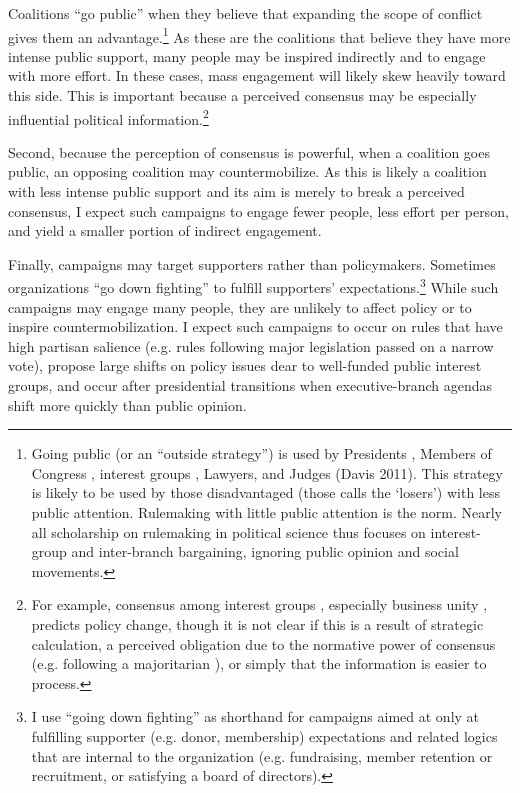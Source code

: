 Coalitions ``go public'' when they believe that expanding the scope of conflict gives them an advantage.\footnote{
Going public (or an ``outside strategy'') is used by Presidents \citep{Kernell2007}, Members of Congress \citep{Malecha2012}, interest groups \citep{Walker1991, Dur2013}, Lawyers, and Judges (Davis 2011). 
This strategy is likely to be used by those disadvantaged (those \citet{Schattschneider1975} calls the `losers') with less public attention.
Rulemaking with little public attention is the norm. Nearly all scholarship on rulemaking in political science thus focuses on interest-group and inter-branch bargaining, ignoring public opinion and social movements. 
}
As these are the coalitions that believe they have more intense public support, many people may be inspired indirectly and to engage with more effort. In these cases, mass engagement will likely skew heavily toward this side. This is important because a perceived consensus may be especially influential political information.\footnote{
For example, consensus among interest groups \citep{Golden1998, Yackee2006JPART}, especially business unity \citep{Yackee2006JOP, Haeder2015}, predicts policy change, though it is not clear if this is a result of strategic calculation, a perceived obligation due to the normative power of consensus (e.g. following a majoritarian \citep{Mendelson2011}), or simply that the information is easier to process.
}

Second, because the perception of consensus is powerful, when a coalition goes public, an opposing coalition may countermobilize. As this is likely a coalition with less intense public support and its aim is merely to break a perceived consensus, I expect such campaigns to engage fewer people, less effort per person, and yield a smaller portion of indirect engagement. 

Finally, campaigns may target supporters rather than policymakers. Sometimes organizations ``go down fighting'' to fulfill supporters' expectations.\footnote{
I use ``going down fighting'' as shorthand for campaigns aimed at only at fulfilling supporter (e.g. donor, membership) expectations and related logics that are internal to the organization (e.g. fundraising, member retention or recruitment, or satisfying a board of directors).} While such campaigns may engage many people, they are unlikely to affect policy or to inspire countermobilization. I expect such campaigns to occur on rules that have high partisan salience (e.g. rules following major legislation passed on a narrow vote), propose large shifts on policy issues dear to well-funded public interest groups, and occur after presidential transitions when executive-branch agendas shift more quickly than public opinion.


